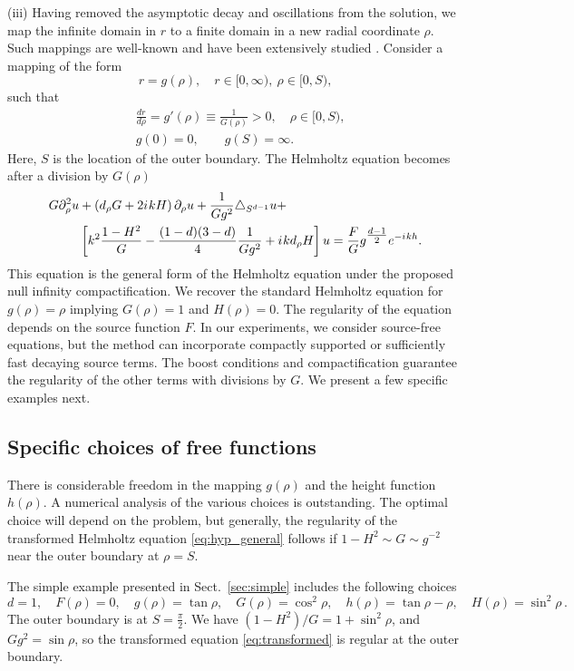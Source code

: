 \documentclass[final,onefignum,onetabnum]{siamart190516}
\newcommand{\iu}{{i\mkern1mu}}
\begin{document}
(iii) Having removed the asymptotic decay and oscillations from the solution, we map the infinite domain in $r$ to a finite domain in a new radial coordinate $\rho$. Such mappings are well-known and have been extensively studied \cite{GroschOrszag77, boyd1982optimization, shen2009some, wang2017perfect}. Consider a mapping of the form
\[ r = g(\rho), \quad r\in[0,\infty),\ \rho\in[0,S), \]
such that
\begin{align*}
	 & \frac{dr}{d\rho} = g'(\rho) \equiv \frac{1}{G(\rho)} > 0, \quad \rho\in [0,S), \\
	 & g(0)      = 0, \qquad g(S) = \infty.
\end{align*}
Here, $S$ is the location of the outer boundary. The Helmholtz equation becomes after a division by $G(\rho)$
\begin{align}
	\label{eq:hyp_general}
	G \partial_\rho^2 u & + \left( d_\rho G + 2 \iu k H \right) \partial_\rho u + \frac{1}{G g^2}\triangle_{S^{d-1}} u +  \nonumber                        \\
	               & \left[k^2 \frac{1-H^2}{G} - \frac{(1-d)(3-d)}{4} \frac{1}{G g^2} + \iu k d_\rho H \right] u = \frac{F}{G} g^{\tfrac{d-1}{2}} e^{-\iu k h}.
\end{align}
This equation is the general form of the Helmholtz equation under the proposed null infinity compactification. We recover the standard Helmholtz equation for $g(\rho) = \rho$ implying $G(\rho)=1$ and $H(\rho)=0$. The regularity of the equation depends on the source function $F$. In our experiments, we consider source-free equations, but the method can incorporate compactly supported or sufficiently fast decaying source terms. The boost conditions and compactification guarantee the regularity of the other terms with divisions by $G$. We present a few specific examples next.

\subsection{Specific choices of free functions}
There is considerable freedom in the mapping $g(\rho)$ and the height function $h(\rho)$. A numerical analysis of the various choices is outstanding. The optimal choice will depend on the problem, but generally, the regularity of the transformed Helmholtz equation \eqref{eq:hyp_general} follows if $1-H^2\sim G\sim g^{-2}$ near the outer boundary at $\rho=S$. 

The simple example presented in Sect.~\ref{sec:simple} includes the following choices
\[ d=1, \quad F(\rho)=0, \quad g(\rho)=\tan \rho, \quad G(\rho) = \cos^2\rho, \quad h(\rho) =\tan\rho - \rho, \quad H(\rho)= \sin^2\rho\,.\]
The outer boundary is at $S=\tfrac{\pi}{2}$. We have $(1-H^2)/G = 1+\sin^2\rho$, and $G g^2 = \sin\rho$, so the transformed equation \eqref{eq:transformed} is regular at the outer boundary. 
\end{document}
